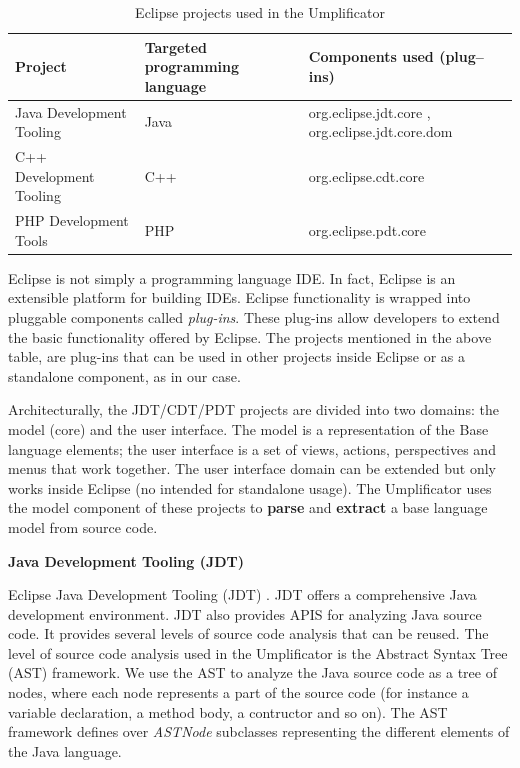 \begin{table}[h]
\caption{Eclipse projects used in the Umplificator}
\label{table:xdtProjects}
\begin{tabularx}{\textwidth}{l|YY}
\toprule
{}
\textbf{Project} & \textbf{Targeted programming language}  & \textbf{Components used (plug--ins)}  \\ \hline
	Java Development Tooling & Java   & org.eclipse.jdt.core , org.eclipse.jdt.core.dom  \\ \hline
	C++ Development Tooling  & C++   & org.eclipse.cdt.core \\ \hline
	PHP Development Tools	 & PHP   & org.eclipse.pdt.core \\ \hline
\end{tabularx}
\end{table}

Eclipse is not simply a programming language IDE. In fact,  Eclipse is an extensible platform for building IDEs. Eclipse functionality is wrapped into pluggable components called \textit{plug-ins}. These plug-ins allow developers to extend the basic functionality offered by Eclipse. The projects mentioned in the above table, are plug-ins that can be used in other projects inside Eclipse or as a standalone component, as in our case.

Architecturally, the JDT/CDT/PDT projects are divided into two domains: the model (core) and the user interface. The model is a representation of the Base language elements; the user interface is a set of views, actions, perspectives and menus that work together. The user interface domain can be extended but only works inside Eclipse (no intended for standalone usage).  The Umplificator uses the model component of these projects to \textbf{parse} and \textbf{extract} a base language model from source code. 

\textbf{Java Development Tooling (JDT)}

 Eclipse Java Development Tooling (JDT) \cite{jdtProject}. JDT offers a comprehensive Java development environment. JDT also provides APIS for analyzing Java source code. It provides several levels of source code analysis that can be reused. The level of source code analysis used in the Umplificator is the Abstract Syntax Tree (AST) framework. We use the AST to analyze the Java source code as a tree of nodes, where each node represents a part of the source code (for instance a variable declaration, a method body, a contructor and so on). The AST framework defines over \textit{ASTNode} \cite{astnodeapi} subclasses representing the different elements of the Java language. 
  
